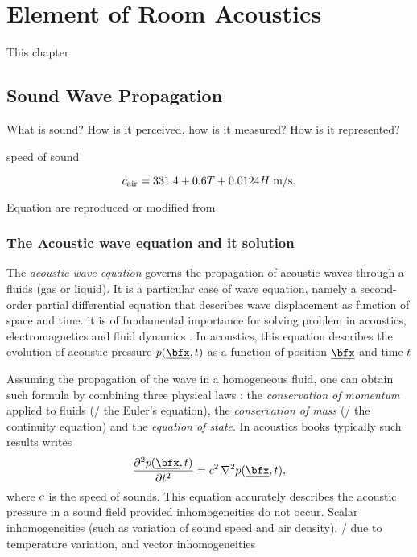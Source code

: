 \chapter{Element of Room Acoustics}\label{chap:acoustics}

 This chapter

\section{Sound Wave Propagation}
What is sound? How is it perceived, how is it measured? How is it represented?

speed of sound

\begin{equation}
    c_\text{air} =  331.4 + 0.6T + 0.0124H \; \text{m/s}
    .
\end{equation}

Equation are reproduced or modified from \cite{Kuttruff2009room, Marczuk2006modelling, Habets2010generator}

\subsection{The Acoustic wave equation and it solution}
\label{subsec:acoustics:waveq}
The \textit{acoustic wave equation} governs the propagation of acoustic waves through a fluids (gas or liquid).
It is a particular case of wave equation, namely a second-order partial differential equation that describes wave displacement as function of space and time.
it is of fundamental importance for solving problem in acoustics, electromagnetics and fluid dynamics
.
In acoustics, this equation describes the evolution of acoustic pressure $\pressure(\positionMicrophone, t)$
as a function of position $\positionMicrophone$ and time $t$

Assuming the propagation of the wave in a homogeneous fluid, one can obtain such formula by combining three physical laws :
the \textit{conservation of momentum} applied to fluids (\aka/ the Euler's equation),
the \textit{conservation of mass} (\aka/ the continuity equation) and
the \textit{equation of state}.
In acoustics books typically such results writes
\begin{equation}
    \label{eq:acoustics:wave}
    \kpderiv[2]{\pressure(\positionMicrophone, t)}{t} = \speedOfSound^2 \knabla^2 \pressure(\positionMicrophone, t)
    ,
\end{equation}
where $c$ is the speed of sounds.
This equation accurately describes the acoustic pressure in a sound field provided inhomogeneities do not occur.
Scalar inhomogeneities (such as variation of sound speed and air density), \eg/ due to temperature variation, and
vector inhomogeneities

